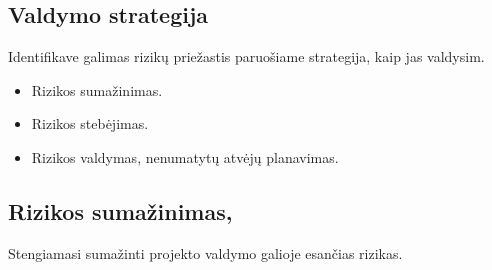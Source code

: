 \documentclass[a4paper,12pt]{article}
\begin{document}
\subsection{Valdymo strategija}
Identifikave galimas rizik\k u prie\v zastis paruo\v siame strategija, kaip jas valdysim.
\begin{itemize}
  \item Rizikos suma\v zinimas.
  \item Rizikos steb\. ejimas.
  \item Rizikos valdymas, nenumatyt\k u atv\. ej\k u planavimas.
\end{itemize}

\newpage

\subsection{Rizikos suma\v zinimas, }
Stengiamasi suma\v zinti projekto valdymo galioje esan\v cias rizikas.
\end{document}
